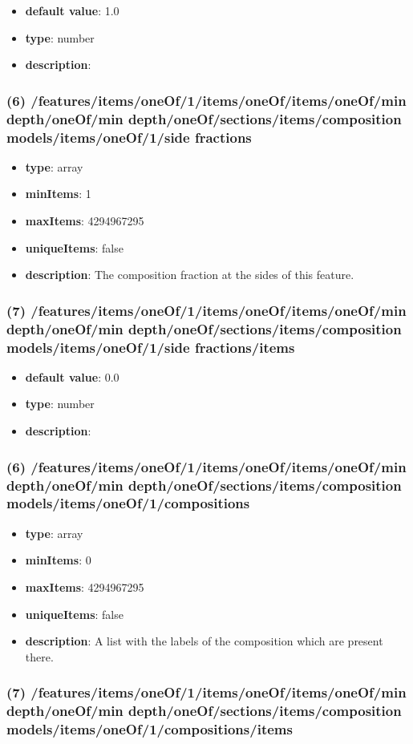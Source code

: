 \begin{itemize}[leftmargin=7em]\item {\bf default value}: 1.0
\item {\bf type}: number
\item {\bf description}: 
\end{itemize}\subsubsection{(6) /features/items/oneOf/1/items/oneOf/items/oneOf/min depth/oneOf/min depth/oneOf/sections/items/composition models/items/oneOf/1/side fractions}
\begin{itemize}[leftmargin=6em]\item {\bf type}: array
\item {\bf minItems}: 1
\item {\bf maxItems}: 4294967295
\item {\bf uniqueItems}: false
\item {\bf description}: The composition fraction at the sides of this feature.
\end{itemize}\subsubsection{(7) /features/items/oneOf/1/items/oneOf/items/oneOf/min depth/oneOf/min depth/oneOf/sections/items/composition models/items/oneOf/1/side fractions/items}
\begin{itemize}[leftmargin=7em]\item {\bf default value}: 0.0
\item {\bf type}: number
\item {\bf description}: 
\end{itemize}\subsubsection{(6) /features/items/oneOf/1/items/oneOf/items/oneOf/min depth/oneOf/min depth/oneOf/sections/items/composition models/items/oneOf/1/compositions}
\begin{itemize}[leftmargin=6em]\item {\bf type}: array
\item {\bf minItems}: 0
\item {\bf maxItems}: 4294967295
\item {\bf uniqueItems}: false
\item {\bf description}: A list with the labels of the composition which are present there.
\end{itemize}\subsubsection{(7) /features/items/oneOf/1/items/oneOf/items/oneOf/min depth/oneOf/min depth/oneOf/sections/items/composition models/items/oneOf/1/compositions/items}
